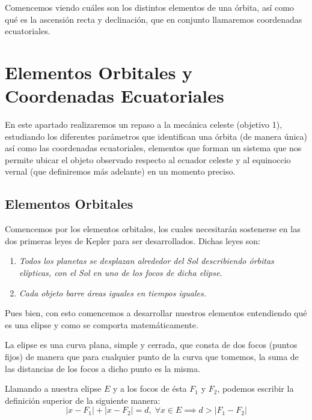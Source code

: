 Comencemos viendo cuáles son los distintos elementos de una órbita, así como qué es la ascensión recta y declinación, que en conjunto llamaremos coordenadas ecuatoriales.\\





\section{Elementos Orbitales y Coordenadas Ecuatoriales}
\label{sec:orbital_elements_equatorial_coordinates}
En este apartado realizaremos un repaso a la mecánica celeste (objetivo 1), estudiando los diferentes parámetros que identifican una órbita (de manera única) así como las coordenadas ecuatoriales, elementos que forman un sistema que nos permite ubicar el objeto observado respecto al ecuador celeste y al equinoccio vernal (que definiremos más adelante) en un momento preciso.\\

\subsection{Elementos Orbitales}
\label{subsec:orbital_elements}
Comencemos por los elementos orbitales, los cuales necesitarán sostenerse en las dos primeras leyes de Kepler para ser desarrollados. Dichas leyes son:

\begin{enumerate}
\item \textit{Todos los planetas se desplazan alrededor del Sol describiendo órbitas elípticas, con el Sol en uno de los focos de dicha elipse.}
\item \textit{Cada objeto barre áreas iguales en tiempos iguales.}
\end{enumerate}

Pues bien, con esto comencemos a desarrollar nuestros elementos entendiendo qué es una elipse y como se comporta matemáticamente.
\begin{definition}
La elipse es una curva plana, simple y cerrada, que consta de dos focos (puntos fijos) de manera que para cualquier punto de la curva que tomemos, la suma de las distancias de los focos a dicho punto es la misma.
\end{definition}

Llamando a nuestra elipse $E$ y a los focos de ésta $F_1$ y $F_2$, podemos escribir la definición superior de la siguiente manera:
\[
|x-F_1|+|x-F_2|=d, \; \forall x \in E \implies d>|F_1-F_2|
\]

